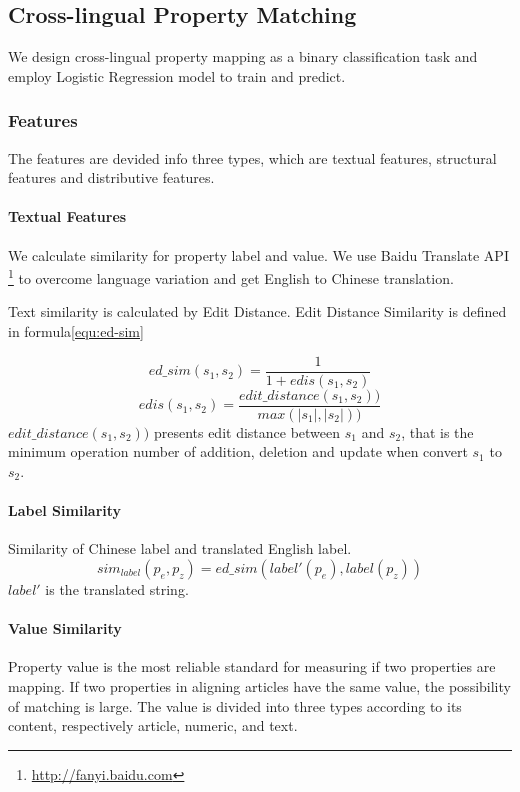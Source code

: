 \documentclass[runningheads,a4paper]{llncs}
\begin{document}
\subsection{Cross-lingual Property Matching}
We design cross-lingual property mapping as a binary classification task and employ Logistic Regression model to train and predict.

\subsubsection{Features}
The features are devided info three types, which are textual features, structural features and distributive features.

\paragraph{Textual Features} We calculate similarity for property label and value. We use Baidu Translate API \footnote{\url{http://fanyi.baidu.com}} to overcome language variation and get English to Chinese translation.

Text similarity is calculated by Edit Distance. Edit Distance Similarity is defined in formula\ref{equ:ed-sim}

\begin{equation}
\label{equ:ed-sim}
ed\_sim(s_1, s_2) = \frac{1}{1+edis(s_1,s_2)}
\end{equation}
\begin{equation}
edis(s_1,s_2)=\frac{edit\_distance(s_1, s_2))}{max(\left| s_1 \right |,\left | s_2 \right |))}
\end{equation}
$edit\_distance(s_1, s_2))$ presents edit distance between $s_1$ and $s_2$, that is the minimum operation number of addition, deletion and update when convert $s_1$ to $s_2$.

\paragraph{Label Similarity} Similarity of Chinese label and translated English label.
\begin{equation}
\label{}
sim_{label}(p_e, p_z) = ed\_sim(label'(p_e), label(p_z))
\end{equation}
$label'$ is the translated string.

\paragraph{Value Similarity} Property value is the most reliable standard for measuring if two properties are mapping. If two properties in aligning articles have the same value, the possibility of matching is large. The value is divided into three types according to its content, respectively article, numeric, and text. 
\end{document}
